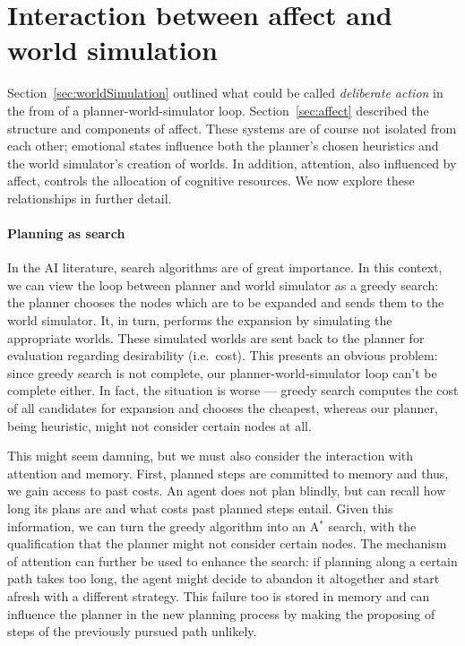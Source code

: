 \documentclass[]{scrartcl}
\theoremstyle{break}
\begin{document}
\section{Interaction between affect and world simulation}

Section~\ref{sec:worldSimulation} outlined what could be called {\em deliberate action} in the from of a planner-world-simulator loop. Section~\ref{sec:affect} described the structure and components of affect. These systems are of course not isolated from each other; emotional states influence both the planner's chosen heuristics and the world simulator's creation of worlds. In addition, attention, also influenced by affect, controls the allocation of cognitive resources. We now explore these relationships in further detail.

\paragraph{Planning as search} In the AI literature, search algorithms are of great importance. In this context, we can view the loop between planner and world simulator as a greedy search: the planner chooses the nodes which are to be expanded and sends them to the world simulator. It, in turn, performs the expansion by simulating the appropriate worlds. These simulated worlds are sent back to the planner for evaluation regarding desirability (i.e.\ cost). This presents an obvious problem: since greedy search is not complete, our planner-world-simulator loop can't be complete either. In fact, the situation is worse --- greedy search computes the cost of all candidates for expansion and chooses the cheapest, whereas our planner, being heuristic, might not consider certain nodes at all.

This might seem damning, but we must also consider the interaction with attention and memory. First, planned steps are committed to memory and thus, we gain access to past costs. An agent does not plan blindly, but can recall how long its plans are and what costs past planned steps entail. Given this information, we can turn the greedy algorithm into an A$^*$ search, with the qualification that the planner might not consider certain nodes. The mechanism of attention can further be used to enhance the search: if planning along a certain path takes too long, the agent might decide to abandon it altogether and start afresh with a different strategy. This failure too is stored in memory and can influence the planner in the new planning process by making the proposing of steps of the previously pursued path  unlikely.
\end{document}
